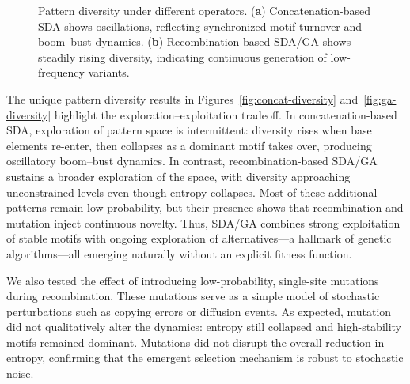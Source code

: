 \documentclass[life,article,submit,pdftex,moreauthors]{Definitions/mdpi}
\begin{document}
\begin{figure}[H]
\centering
{}
\hfill
{}
\caption{Pattern diversity under different operators. (\textbf{a}) Concatenation-based SDA shows oscillations, reflecting synchronized motif turnover and boom--bust dynamics. (\textbf{b}) Recombination-based SDA/GA shows steadily rising diversity, indicating continuous generation of low-frequency variants.}
\label{fig:diversity-comparison}
\end{figure}


The unique pattern diversity results in Figures~\ref{fig:concat-diversity} and~\ref{fig:ga-diversity} highlight the exploration--exploitation tradeoff. 
In concatenation-based SDA, exploration of pattern space is intermittent: 
diversity rises when base elements re-enter, then collapses as a dominant 
motif takes over, producing oscillatory boom--bust dynamics. In contrast, 
recombination-based SDA/GA sustains a broader exploration of the space, 
with diversity approaching unconstrained levels even though entropy 
collapses. Most of these additional patterns remain low-probability, but 
their presence shows that recombination and mutation inject continuous 
novelty. Thus, SDA/GA combines strong exploitation of stable motifs with 
ongoing exploration of alternatives---a hallmark of genetic algorithms---all 
emerging naturally without an explicit fitness function.


We also tested the effect of introducing low-probability, single-site mutations during recombination. 
These mutations serve as a simple model of stochastic perturbations such as copying errors or 
diffusion events. As expected, mutation did not qualitatively alter the dynamics: entropy still 
collapsed and high-stability motifs remained dominant. Mutations did not disrupt the overall reduction in entropy, confirming that the emergent selection mechanism is robust to stochastic noise.
\end{document}
